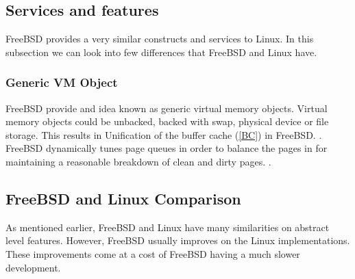 \documentclass[journal,10pt,onecolumn,compsoc,letterpaper,draftclsnofoot,table,xcdraw]{IEEEtran} \usepackage[margin=0.75in]{geometry}
\begin{document}
\subsection{Services and features}
\noindent FreeBSD provides a very similar constructs and services to Linux. In this subsection we can look into few differences that FreeBSD and Linux have.

\subsubsection{Generic VM Object}
\noindent FreeBSD provide and idea known as generic virtual memory objects. Virtual memory objects could be unbacked, backed with swap, physical device or file storage. This results in Unification of the buffer cache (\ref{BC}) in FreeBSD. \cite{4}. FreeBSD dynamically tunes page queues in order to balance the pages in for maintaining a reasonable breakdown of clean and dirty pages. \cite{4}.

\subsection{FreeBSD and Linux Comparison}
\noindent As mentioned earlier, FreeBSD and Linux have many similarities on abstract level features. However, FreeBSD usually improves on the Linux implementations. These improvements come at a cost of FreeBSD having a much slower development.
\newpage


\end{document}
